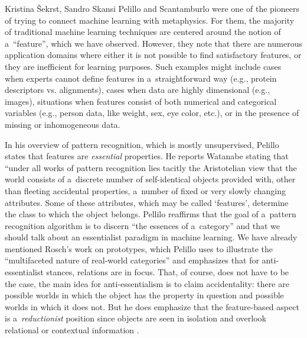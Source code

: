 \begin{artengenv2auth}{Kristina Šekrst, Sandro Skansi}
Pelillo and Scantamburlo
\parencite*[][]{hutchison_how_2013} %
 were one of the pioneers of trying to connect machine learning with metaphysics. For them, the majority of traditional machine learning techniques are centered around the notion of a~``feature'', which we have observed. However, they note that there are numerous application domains where either it is not possible to find satisfactory features, or they are inefficient for learning purposes. Such examples might include cases when experts cannot define features in a~straightforward way (e.g., protein descriptors vs. alignments), cases when data are highly dimensional (e.g., images), situations when features consist of both numerical and categorical variables (e.g., person data, like weight, sex, eye color, etc.), or in the presence of missing or inhomogeneous data.

In his overview of pattern recognition, which is mostly unsupervised, Pelillo
\parencite*[][]{pelillo_introduction_2013} %
 states that features are \textit{essential} properties. He reports Watanabe 
\parencite*[][]{watanabe_pattern_1985} %
 stating that ``under all works of pattern recognition lies tacitly the Aristotelian view that the world consists of a~discrete number of self-identical objects provided with, other than fleeting accidental properties, a~number of fixed or very slowly changing attributes. Some of these attributes, which may be called ‘features', determine the class to which the object belongs. Pellilo 
\parencite*[][p.2]{pelillo_introduction_2013} %
 reaffirms that the goal of a~pattern recognition algorithm is to discern ``the essences of a~category'' and that we should talk about an essentialist paradigm in machine learning. We have already mentioned Rosch's 
\parencite*[][]{rosch_natural_1973} %
 work on prototypes, which Pelillo 
\parencite*[][p.2]{pelillo_introduction_2013} %
 uses to illustrate the ``multifaceted nature of real-world categories'' and emphasizes that for anti-essentialist stances, relations are in focus. That, of course, does not have to be the case, the main idea for anti-essentialism is to claim accidentality: there are possible worlds in which the object has the property in question and possible worlds in which it does not. But he does emphasize that the feature-based aspect is a~\textit{reductionist} position since objects are seen in isolation and overlook relational or contextual information 
\parencite[][p.1]{pelillo_introduction_2013}.%



\end{artengenv2auth}
